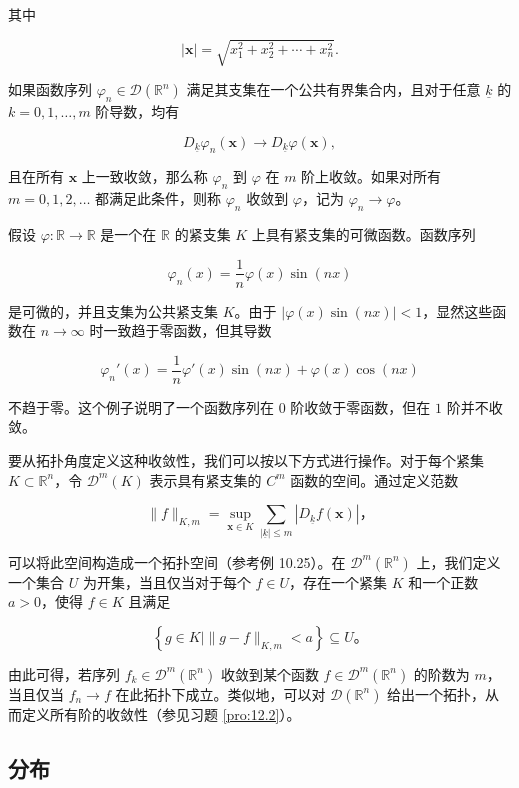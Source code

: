 其中

$$
|\mathbf{x}| = \sqrt{x_1^2 + x_2^2 + \cdots + x_n^2}.
$$

如果函数序列 $\varphi_n \in \mathcal{D}(\mathbb{R}^n)$
满足其支集在一个公共有界集合内，且对于任意 $\underline{k}$ 的
$k=0, 1, \ldots, m$ 阶导数，均有

$$
D_{\underline{k}} \varphi_n(\mathbf{x}) \to D_{\underline{k}} \varphi(\mathbf{x}),
$$

且在所有 $\mathbf{x}$ 上一致收敛，那么称 $\varphi_n$ 到 $\varphi$
在 $m$ 阶上收敛。如果对所有 $m=0,1,2,\ldots$ 都满足此条件，则称
$\varphi_n$ 收敛到 $\varphi$，记为 $\varphi_n \to \varphi$。
\begin{eg}
  假设 $\varphi: \mathbb{R} \to \mathbb{R}$ 是一个在
$\mathbb{R}$ 的紧支集 $K$ 上具有紧支集的可微函数。函数序列

$$
\varphi_n(x) = \frac{1}{n} \varphi(x) \sin(nx)
$$

是可微的，并且支集为公共紧支集 $K$。由于
$|\varphi(x) \sin(nx)| < 1$，显然这些函数在 $n \to \infty$
时一致趋于零函数，但其导数

$$
\varphi_n'(x) = \frac{1}{n} \varphi'(x) \sin(nx) + \varphi(x) \cos(nx)
$$

不趋于零。这个例子说明了一个函数序列在 $0$ 阶收敛于零函数，但在 $1$
阶并不收敛。
\end{eg}

要从拓扑角度定义这种收敛性，我们可以按以下方式进行操作。对于每个紧集
$K \subset \mathbb{R}^n$，令 $\mathcal{D}^m(K)$ 表示具有紧支集的
$C^m$ 函数的空间。通过定义范数

$$
\|f\|_{K, m} = \sup_{\mathbf{x} \in K} \sum_{\mid \underline{k} \mid \leq m}\left|D_{\underline{k}} f(\mathbf{x})\right|，
$$

可以将此空间构造成一个拓扑空间（参考例 10.25）。在
$\mathcal{D}^m(\mathbb{R}^n)$ 上，我们定义一个集合 $U$
为开集，当且仅当对于每个 $f \in U$，存在一个紧集 $K$ 和一个正数
$a > 0$，使得 $f \in K$ 且满足

$$
\left\{g \in K \mid \|g - f\|_{K, m} < a\right\} \subseteq U。
$$

由此可得，若序列 $f_k \in \mathcal{D}^m(\mathbb{R}^n)$ 收敛到某个函数
$f \in \mathcal{D}^m(\mathbb{R}^n)$ 的阶数为 $m$，当且仅当
$f_n \to f$ 在此拓扑下成立。类似地，可以对
$\mathcal{D}(\mathbb{R}^n)$
给出一个拓扑，从而定义所有阶的收敛性（参见习题 \ref{pro:12.2}）。

\subsection{分布}

